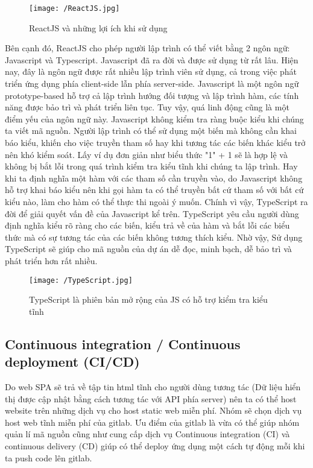 		\begin{figure}[H]
			\texttt{[image: /ReactJS.jpg]}
			\centering
			\linebreak
			\caption{ReactJS và những lợi ích khi sử dụng}
		\end{figure}
		
		Bên cạnh đó, ReactJS cho phép người lập trình có thể viết bằng 2 ngôn ngữ: Javascript và Typescript. Javascript đã ra đời và được sử dụng từ rất lâu. Hiện nay, đây là ngôn ngữ được rất nhiều lập trình viên sử dụng, cả trong việc phát triển ứng dụng phía client-side lẫn phía server-side. Javascript là một ngôn ngữ prototype-based hỗ trợ cả lập trình hướng đối tượng và lập trình hàm, các tính năng được bảo trì và phát triển liên tục. Tuy vậy, quá linh động cũng là một điểm yếu của ngôn ngữ này. Javascript không kiểm tra ràng buộc kiểu khi chúng ta viết mã nguồn. Người lập trình có thể sử dụng một biến mà không cần khai báo kiểu, khiến cho việc truyền tham số hay khi tương tác các biến khác kiểu trở nên khó kiểm soát. Lấy ví dụ đơn giản như biểu thức "1" + 1 sẽ là hợp lệ và không bị bắt lỗi trong quá trình kiểm tra kiểu tĩnh khi chúng ta lập trình. Hay khi ta định nghĩa một hàm với các tham số cần truyền vào, do Javascript không hỗ trợ khai báo kiểu nên khi gọi hàm ta có thể truyền bất cứ tham số với bất cứ kiểu nào, làm cho hàm có thể thực thi ngoài ý muốn. Chính vì vậy, TypeScript ra đời để giải quyết vấn đề của Javascript kể trên. TypeScript yêu cầu người dùng định nghĩa kiểu rõ ràng cho các biến, kiểu trả về của hàm và bắt lỗi các biểu thức mà có sự tương tác của các biến không tương thích kiểu. Nhờ vậy, Sử dụng TypeScript sẽ giúp cho mã nguồn của dự án dễ đọc, minh bạch, dễ bảo trì và phát triển hơn rất nhiều.
		
		\begin{figure}[H]
			\texttt{[image: /TypeScript.jpg]}
			\centering
			\linebreak
			\caption{TypeScript là phiên bản mở rộng của JS có hỗ trợ kiểm tra kiểu tĩnh}
		\end{figure}
	
        \subsection{Continuous integration / Continuous deployment (CI/CD)}	
		Do web SPA sẽ trả về tập tin html tĩnh cho người dùng tương tác (Dữ liệu hiển thị được cập nhật bằng cách tương tác với API phía server) nên ta có thể host website trên những dịch vụ cho host static web miễn phí. Nhóm sẽ chọn dịch vụ host web tĩnh miễn phí của gitlab. Ưu điểm của gitlab là vừa có thể giúp nhóm quản lí mã nguồn cũng như cung cấp dịch vụ Continuous integration (CI) và continuous delivery (CD) giúp có thể deploy ứng dụng một cách tự động mỗi khi ta push code lên gitlab.\\
		

